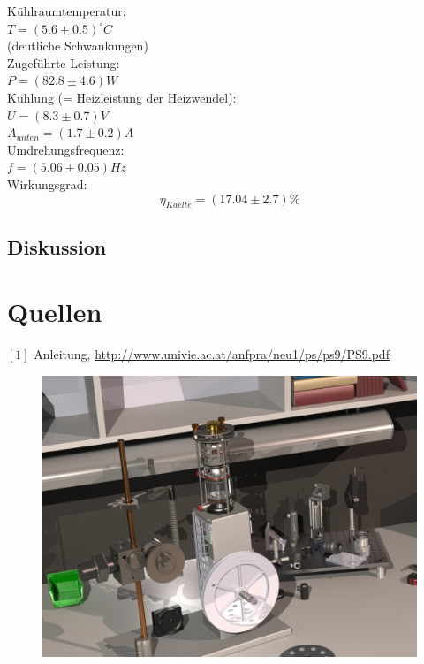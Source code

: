 \documentclass[12pt,a4paper]{article}
\begin{document}
\begin{multicols}{2}
Kühlraumtemperatur:\\ 
$T= (5.6 \pm 0.5)^{\circ}C$\\
\indent (deutliche Schwankungen)\\
Zugeführte Leistung:\\
$P=(82.8 \pm 4.6)W$\\
\noindent Kühlung (= Heizleistung der Heizwendel):\\ 
$U= (8.3 \pm 0.7)V$\\
$A_{unten} = (1.7 \pm 0.2)A$\\
\noindent Umdrehungsfrequenz:\\
$f = (5.06\pm 0.05)Hz$\\
Wirkungsgrad:\\
$$\eta_{Kaelte}=(17.04\pm 2.7)\%$$

\subsection{Diskussion}





\section{Quellen}
$[1]$ Anleitung, \url{http://www.univie.ac.at/anfpra/neu1/ps/ps9/PS9.pdf}\\

\end{multicols}

\begin{figure}[H]
	\centering
	\includegraphics[scale=2]{./data/3D-Model/PS9-model_desk01.JPG}
	\label{fig:stirlingMotor_3D-desktop}
\end{figure}
\end{document}
